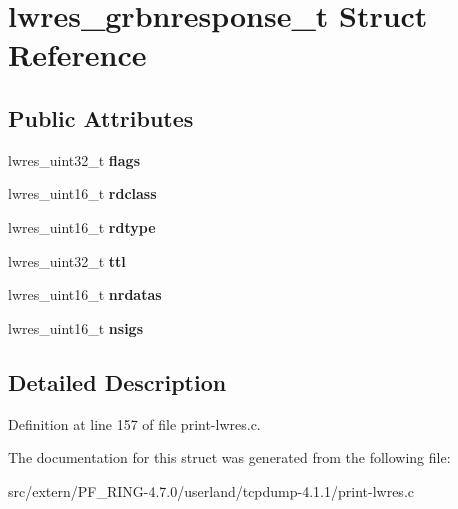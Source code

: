 \hypertarget{structlwres__grbnresponse__t}{
\section{lwres\_\-grbnresponse\_\-t Struct Reference}
\label{structlwres__grbnresponse__t}
}
\subsection*{Public Attributes}
\begin{DoxyCompactItemize}
\item 
\hypertarget{structlwres__grbnresponse__t_a46b84e629561fef414fc1cdcf3a47487}{
lwres\_\-uint32\_\-t {\bfseries flags}}
\label{structlwres__grbnresponse__t_a46b84e629561fef414fc1cdcf3a47487}

\item 
\hypertarget{structlwres__grbnresponse__t_afc50c8c45dbc970d603900b8b13d7a44}{
lwres\_\-uint16\_\-t {\bfseries rdclass}}
\label{structlwres__grbnresponse__t_afc50c8c45dbc970d603900b8b13d7a44}

\item 
\hypertarget{structlwres__grbnresponse__t_abdc5d2e8216222e340c7e10cf8426677}{
lwres\_\-uint16\_\-t {\bfseries rdtype}}
\label{structlwres__grbnresponse__t_abdc5d2e8216222e340c7e10cf8426677}

\item 
\hypertarget{structlwres__grbnresponse__t_a038c0ebe2738d9218e14e8dcfb59b3a0}{
lwres\_\-uint32\_\-t {\bfseries ttl}}
\label{structlwres__grbnresponse__t_a038c0ebe2738d9218e14e8dcfb59b3a0}

\item 
\hypertarget{structlwres__grbnresponse__t_a68c57e99c884578fef5693a16ab1bab6}{
lwres\_\-uint16\_\-t {\bfseries nrdatas}}
\label{structlwres__grbnresponse__t_a68c57e99c884578fef5693a16ab1bab6}

\item 
\hypertarget{structlwres__grbnresponse__t_a58434c52c2f31556b6e54e0b7a6cb51e}{
lwres\_\-uint16\_\-t {\bfseries nsigs}}
\label{structlwres__grbnresponse__t_a58434c52c2f31556b6e54e0b7a6cb51e}

\end{DoxyCompactItemize}


\subsection{Detailed Description}


Definition at line 157 of file print-\/lwres.c.



The documentation for this struct was generated from the following file:\begin{DoxyCompactItemize}
\item 
src/extern/PF\_\-RING-\/4.7.0/userland/tcpdump-\/4.1.1/print-\/lwres.c\end{DoxyCompactItemize}
